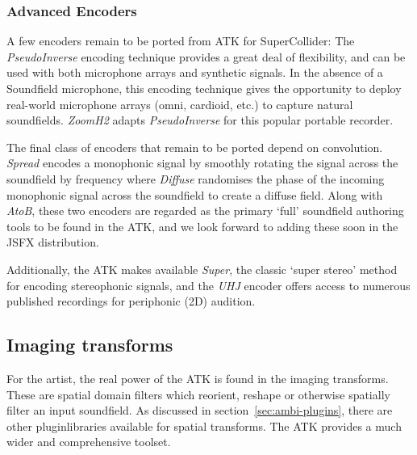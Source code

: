 \documentclass{article}
\begin{document}
\subsubsection{Advanced Encoders}\label{sec:impending-encoders}

A few encoders remain to be ported from ATK for SuperCollider:
The \emph{PseudoInverse} encoding technique provides a great deal of flexibility, and can be used with both microphone arrays and synthetic signals. 
In the absence of a Soundfield microphone, this encoding technique gives the opportunity to deploy real-world microphone arrays (omni, cardioid, etc.) to capture natural soundfields.
\emph{Zoom\-H2} adapts \emph{PseudoInverse} for this popular portable recorder.

The final class of encoders that remain to be ported depend on convolution.
\emph{Spread} encodes a monophonic signal by smoothly rotating the signal across the soundfield by frequency where \emph{Diffuse} randomises the phase of the incoming monophonic signal across the soundfield to create a diffuse field.
Along with \emph{AtoB}, these two encoders are regarded as the primary `full' soundfield authoring tools to be found in the ATK, and we look forward to adding these soon in the JSFX distribution.

Additionally, the ATK makes available \emph{Super}, the classic `super stereo' method for encoding stereophonic signals, and the \emph{UHJ} encoder offers access to numerous published recordings for periphonic (2D) audition.


\subsection{Imaging transforms}\label{sec:transforms}

For the artist, the real power of the ATK is found in the imaging transforms.
These are spatial domain filters which reorient, reshape or otherwise spatially filter an input soundfield.
As discussed in section~\ref{sec:ambi-plugins}, there are other plugin\linebreak libraries available for spatial transforms.
The ATK provides a much wider and comprehensive toolset.
\end{document}

